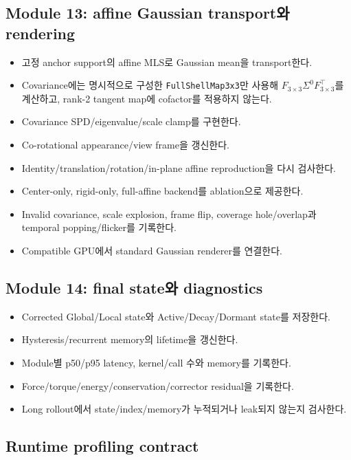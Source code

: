 \documentclass[10pt,a4paper]{article}
\newcommand{\todo}{\textcolor{TodoGray}{\(\square\)}}
\newcommand{\code}[1]{\texttt{#1}}
\begin{document}
\subsection*{Module 13: affine Gaussian transport와 rendering}

\begin{itemize}
  \item[\todo] 고정 anchor support의 affine MLS로 Gaussian mean을 transport한다.
  \item[\todo] Covariance에는 명시적으로 구성한 \code{FullShellMap3x3}만 사용해 \(F_{3\times3}\Sigma^0F_{3\times3}^\top\)를 계산하고, rank-2 tangent map에 cofactor를 적용하지 않는다.
  \item[\todo] Covariance SPD/eigenvalue/scale clamp를 구현한다.
  \item[\todo] Co-rotational appearance/view frame을 갱신한다.
  \item[\todo] Identity/translation/rotation/in-plane affine reproduction을 다시 검사한다.
  \item[\todo] Center-only, rigid-only, full-affine backend를 ablation으로 제공한다.
  \item[\todo] Invalid covariance, scale explosion, frame flip, coverage hole/overlap과 temporal popping/flicker를 기록한다.
  \item[\todo] Compatible GPU에서 standard Gaussian renderer를 연결한다.
\end{itemize}

\subsection*{Module 14: final state와 diagnostics}

\begin{itemize}
  \item[\todo] Corrected Global/Local state와 Active/Decay/Dormant state를 저장한다.
  \item[\todo] Hysteresis/recurrent memory의 lifetime을 갱신한다.
  \item[\todo] Module별 p50/p95 latency, kernel/call 수와 memory를 기록한다.
  \item[\todo] Force/torque/energy/conservation/corrector residual을 기록한다.
  \item[\todo] Long rollout에서 state/index/memory가 누적되거나 leak되지 않는지 검사한다.
\end{itemize}

\subsection*{Runtime profiling contract}
\end{document}
